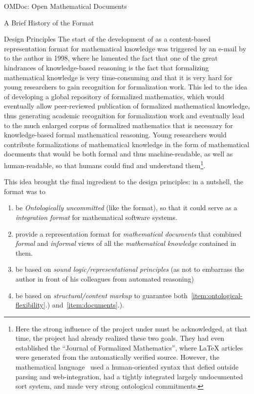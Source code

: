 \begin{tchapter}[id=omdoc-markup,short=Open Mathematical Documents]{OMDoc: Open Mathematical Documents}
\begin{tsection}[id=omdoc-history]{A Brief History of the {\omdoc} Format}
  \begin{tsubsection}{Design Principles}
    The start of the development of {\omdoc} as a content-based representation format for
    mathematical knowledge was triggered by an e-mail by {} to the
    author in 1998, where he lamented the fact that one of the great hindrances of
    knowledge-based reasoning is the fact that formalizing mathematical knowledge is very
    time-consuming and that it is very hard for young researchers to gain recognition for
    formalization work. This led to the idea of developing a global repository of
    formalized mathematics, which would eventually allow peer-reviewed publication of
    formalized mathematical knowledge, thus generating academic recognition for
    formalization work and eventually lead to the much enlarged corpus of formalized
    mathematics that is necessary for knowledge-based formal mathematical reasoning. Young
    researchers would contribute formalizations of mathematical knowledge in the form of
    mathematical documents that would be both formal and thus machine-readable, as well as
    human-readable, so that humans could find and understand them\footnote{Here the strong
      influence of the {\mizar} project under {} must be
      acknowledged, at that time, the project had already realized these two goals. They
      had even established the ``Journal of Formalized Mathematics'', where {\LaTeX}
      articles were generated from the automatically verified {\mizar} source. However,
      the {\mizar} mathematical language~\cite{URL:MizarLanguage} used a human-oriented
      syntax that defied outside parsing and web-integration, had a tightly integrated
      largely undocumented sort system, and made very strong ontological commitments.}.
      
    This idea brought the final ingredient to the design principles: in a nutshell, the
    {\omdoc} format was to 
    \begin{enumerate}
    \item\label{item:ontological-flexibility} be {\emph{Ontologically uncommitted}} (like
      the {\openmath} format), so that it could serve as a {\emph{integration format}} for
      mathematical software systems.
    \item\label{item:documents} provide a representation format for {\emph{mathematical
          documents}} that combined {\emph{formal}} and {\emph{informal}} views of all the
      {\emph{mathematical knowledge}} contained in them.
    \item\label{item:logic} be based on {\emph{sound logic/representational principles}}
      (as not to embarrass the author in front of his colleagues from automated reasoning)
    \item\label{item:content-markup} be based on {\emph{structural/content markup}} to
      guarantee both~\ref{item:ontological-flexibility}.) and~\ref{item:documents}.).
    \end{enumerate}
  \end{tsubsection}
  

\end{tsection}
\end{tchapter}
